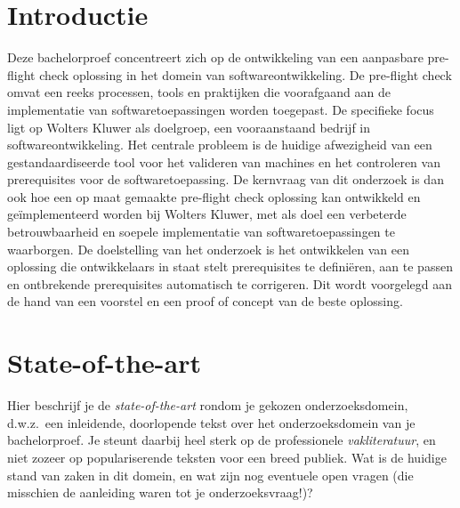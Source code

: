 
\section{Introductie}%
\label{sec:introductie}

Deze bachelorproef concentreert zich op de ontwikkeling van een aanpasbare pre-flight check oplossing in het domein van softwareontwikkeling. De pre-flight check omvat een reeks processen, tools en praktijken die voorafgaand aan de implementatie van softwaretoepassingen worden toegepast. De specifieke focus ligt op Wolters Kluwer als doelgroep, een vooraanstaand bedrijf in softwareontwikkeling. Het centrale probleem is de huidige afwezigheid van een gestandaardiseerde tool voor het valideren van machines en het controleren van prerequisites voor de softwaretoepassing. De kernvraag van dit onderzoek is dan ook hoe een op maat gemaakte pre-flight check oplossing kan ontwikkeld en geïmplementeerd worden bij Wolters Kluwer, met als doel een verbeterde betrouwbaarheid en soepele implementatie van softwaretoepassingen te waarborgen. De doelstelling van het onderzoek is het ontwikkelen van een oplossing die ontwikkelaars in staat stelt prerequisites te definiëren, aan te passen en ontbrekende prerequisites automatisch te corrigeren. Dit wordt voorgelegd aan de hand van een voorstel en een proof of concept van de beste oplossing.






\section{State-of-the-art}%
\label{sec:state-of-the-art}

Hier beschrijf je de \emph{state-of-the-art} rondom je gekozen onderzoeksdomein, d.w.z.\ een inleidende, doorlopende tekst over het onderzoeksdomein van je bachelorproef. Je steunt daarbij heel sterk op de professionele \emph{vakliteratuur}, en niet zozeer op populariserende teksten voor een breed publiek. Wat is de huidige stand van zaken in dit domein, en wat zijn nog eventuele open vragen (die misschien de aanleiding waren tot je onderzoeksvraag!)?

